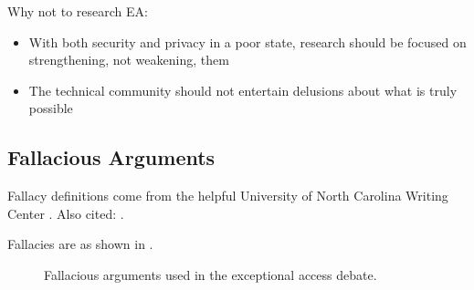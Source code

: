 Why not to research EA:
\begin{itemize}
    \item With both security and privacy in a poor state, research should be focused on strengthening, not weakening,
            them
    \item The technical community should not entertain delusions about what is truly possible
\end{itemize}

\subsection{Fallacious Arguments}

Fallacy definitions come from the helpful University of North Carolina Writing Center \cite{unc_2020}. Also cited:
\cite{hanna_2019}.

Fallacies are as shown in .

\begin{figure}[h]
    \centering\CaptionFontSize
    \caption[Fallacious Arguments]{Fallacious arguments used in the exceptional access debate.}
    \label{fig-args-fallacies}
\end{figure}
